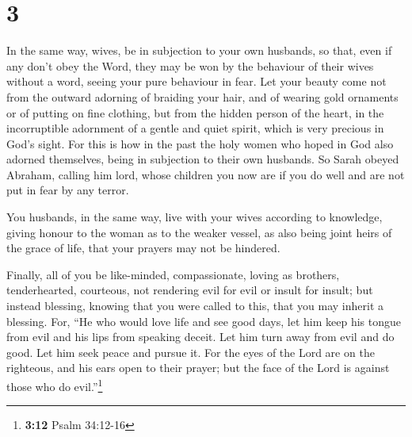 \hypertarget{section-2}{%
\section{3}\label{section-2}}

 In the same way, wives, be in subjection to your own
husbands, so that, even if any don't obey the Word, they may be won by
the behaviour of their wives without a word,  seeing your
pure behaviour in fear.  Let your beauty come not from the
outward adorning of braiding your hair, and of wearing gold ornaments or
of putting on fine clothing,  but from the hidden person
of the heart, in the incorruptible adornment of a gentle and quiet
spirit, which is very precious in God's sight.  For this
is how in the past the holy women who hoped in God also adorned
themselves, being in subjection to their own husbands.  So
Sarah obeyed Abraham, calling him lord, whose children you now are if
you do well and are not put in fear by any terror.

 You husbands, in the same way, live with your wives
according to knowledge, giving honour to the woman as to the weaker
vessel, as also being joint heirs of the grace of life, that your
prayers may not be hindered.

 Finally, all of you be like-minded, compassionate, loving
as brothers, tenderhearted, courteous,  not rendering evil
for evil or insult for insult; but instead blessing, knowing that you
were called to this, that you may inherit a blessing. 
For, ``He who would love life and see good days, let him keep his tongue
from evil and his lips from speaking deceit.  Let him
turn away from evil and do good. Let him seek peace and pursue it.
 For the eyes of the Lord are on the righteous, and his
ears open to their prayer; but the face of the Lord is against those who
do evil.''\footnote{\textbf{3:12} Psalm 34:12-16}

